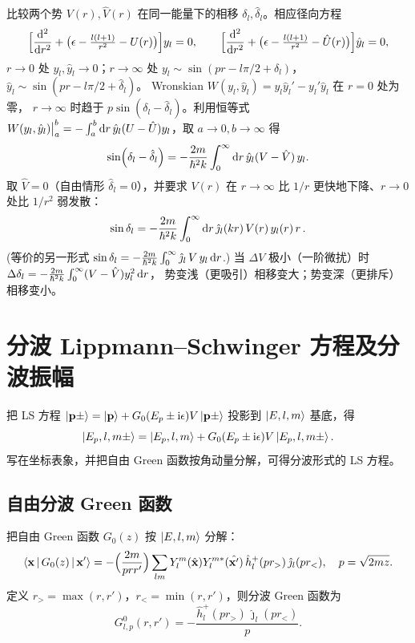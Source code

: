 比较两个势 $V(r),\hat V(r)$ 在同一能量下的相移
$\delta_l,\hat\delta_l$。相应径向方程
\begin{equation}
\Bigl[\frac{\mathrm{d}^2}{\mathrm{d} r^2}+\bigl(\epsilon-\tfrac{l(l+1)}{r^2}-U(r)\bigr)\Bigr]y_l=0,
\qquad
\Bigl[\frac{\mathrm{d}^2}{\mathrm{d} r^2}+\bigl(\epsilon-\tfrac{l(l+1)}{r^2}-\hat U(r)\bigr)\Bigr]\hat y_l=0,
\end{equation}
$r\to0$ 处 $y_l,\hat y_l\to0$；$r\to\infty$ 处
$y_l\sim\sin(pr-l\pi/2+\delta_l)$，$\hat y_l\sim\sin(pr-l\pi/2+\hat\delta_l)$。
Wronskian $W(y_l,\hat y_l)=y_l\hat y_l'-y_l'\hat y_l$ 在 $r=0$ 处为零，
$r\to\infty$ 时趋于 $p\sin(\delta_l-\hat\delta_l)$。利用恒等式
$W(y_l,\hat y_l)\big|_a^b=-\int_a^b\mathrm{d} r\,\hat y_l(U-\hat U)y_l$，取
$a\to0,b\to\infty$ 得
\begin{equation}\label{eq:phase-int}
\sin(\delta_l-\hat\delta_l)
= -\frac{2m}{\hbar^2 k}\int_0^\infty \mathrm{d} r\,\hat y_l(V-\hat V)\,y_l.
\end{equation}
取 $\hat V=0$（自由情形 $\hat\delta_l=0$），并要求 $V(r)$ 在
$r\to\infty$ 比 $1/r$ 更快地下降、$r\to0$ 处比 $1/r^2$ 弱发散：
\begin{equation}\label{eq:phase-int2}
\sin\delta_l=-\frac{2m}{\hbar^2 k}\int_0^\infty \mathrm{d} r\,\hat\jmath_l(kr)\,V(r)\,y_l(r)\,r\,.
\end{equation}
(等价的另一形式 $\sin\delta_l=-\frac{2m}{\hbar^2k}\int_0^\infty\hat\jmath_l\,V\,y_l\,\mathrm{d} r$.)
当 $\Delta V$ 极小（一阶微扰）时
$\Delta\delta_l = -\frac{2m}{\hbar^2k}\int_0^\infty(V-\hat V)y_l^2\,\mathrm{d} r$，
势变浅（更吸引）相移变大；势变深（更排斥）相移变小。

\section{分波 Lippmann--Schwinger 方程及分波振幅}\label{sec:pw-LS}

把 LS 方程 $\ket{\mathbf p\pm}=\ket{\mathbf p}+G_0(E_p\pm\mathrm{i}\epsilon)V\ket{\mathbf p\pm}$
投影到 $\ket{E,l,m}$ 基底，得
\[
\ket{E_p,l,m\pm}=\ket{E_p,l,m}+G_0(E_p\pm\mathrm{i}\epsilon)V\ket{E_p,l,m\pm}.
\]
写在坐标表象，并把自由 Green 函数按角动量分解，可得分波形式的
LS 方程。

\subsection{自由分波 Green 函数}

把自由 Green 函数 $G_0(z)$ 按 $\ket{E,l,m}$ 分解：
\begin{equation}
\left\langle \mathbf x \,\middle|\, G_0(z) \,\middle|\, \mathbf x' \right\rangle
= -\Bigl(\frac{2m}{prr'}\Bigr)\sum_{lm}
   Y_l^m(\hat{\mathbf x})Y_l^{m*}(\hat{\mathbf x'})\,
   \hat h_l^+(pr_>)\,\hat\jmath_l(pr_<),\quad
p=\sqrt{2mz}.
\end{equation}
定义 $r_>=\max(r,r')$，$r_<=\min(r,r')$，则分波 Green 函数为
\begin{equation}\label{eq:G0lp}
G_{l,p}^{0}(r,r')= -\frac{\hat h_l^+(pr_>)\,\hat\jmath_l(pr_<)}{p}.
\end{equation}

